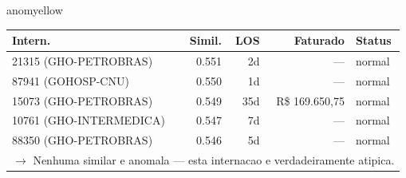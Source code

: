 \documentclass[a4paper,10pt]{article}
\begin{document}
\begin{anomalycard}[Internacao 10983 | GHO-POSTAL | MODERADO (z=2.10)]{anomyellow}
\begin{tabular}{l r r r l}\toprule\textbf{Intern.} & \textbf{Simil.} & \textbf{LOS} & \textbf{Faturado} & \textbf{Status} \\\midrule
21315 (GHO-PETROBRAS) & 0.551 & 2d & --- & \textcolor{jcubeblue}{normal} \\
87941 (GOHOSP-CNU) & 0.550 & 1d & --- & \textcolor{jcubeblue}{normal} \\
15073 (GHO-PETROBRAS) & 0.549 & 35d & R\$ 169.650,75 & \textcolor{jcubeblue}{normal} \\
10761 (GHO-INTERMEDICA) & 0.547 & 7d & --- & \textcolor{jcubeblue}{normal} \\
88350 (GHO-PETROBRAS) & 0.546 & 5d & --- & \textcolor{jcubeblue}{normal} \\
\multicolumn{5}{l}{\textcolor{jcubeblue}{\small $\rightarrow$ Nenhuma similar e anomala --- esta internacao e verdadeiramente atipica.}} \\
\bottomrule\end{tabular}


\end{anomalycard}

\newpage
\end{document}
